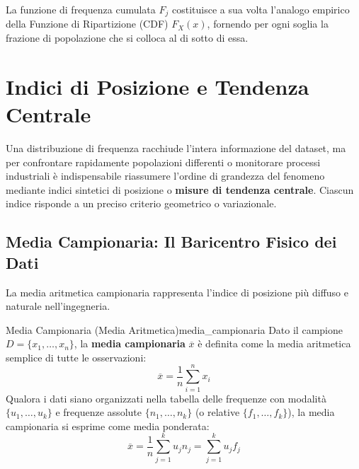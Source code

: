 La funzione di frequenza cumulata $F_j$ costituisce a sua volta l'analogo empirico della Funzione di Ripartizione (CDF) $F_X(x)$, fornendo per ogni soglia la frazione di popolazione che si colloca al di sotto di essa.

\section{Indici di Posizione e Tendenza Centrale}
\label{sec:indici_posizione_dettaglio}

Una distribuzione di frequenza racchiude l'intera informazione del dataset, ma per confrontare rapidamente popolazioni differenti o monitorare processi industriali è indispensabile riassumere l'ordine di grandezza del fenomeno mediante indici sintetici di posizione o \textbf{misure di tendenza centrale}. Ciascun indice risponde a un preciso criterio geometrico o variazionale.

\subsection{Media Campionaria: Il Baricentro Fisico dei Dati}

La media aritmetica campionaria rappresenta l'indice di posizione più diffuso e naturale nell'ingegneria.

\begin{definizione}{Media Campionaria (Media Aritmetica)}{media_campionaria}
Dato il campione $D = \{x_1, \dots, x_n\}$, la \textbf{media campionaria} $\overline{x}$ è definita come la media aritmetica semplice di tutte le osservazioni:
\begin{equation}
\overline{x} = \frac{1}{n}\sum_{i=1}^n x_i
\end{equation}
Qualora i dati siano organizzati nella tabella delle frequenze con modalità $\{u_1, \dots, u_k\}$ e frequenze assolute $\{n_1, \dots, n_k\}$ (o relative $\{f_1, \dots, f_k\}$), la media campionaria si esprime come media ponderata:
\begin{equation}
\overline{x} = \frac{1}{n}\sum_{j=1}^k u_j n_j = \sum_{j=1}^k u_j f_j
\end{equation}
\end{definizione}

